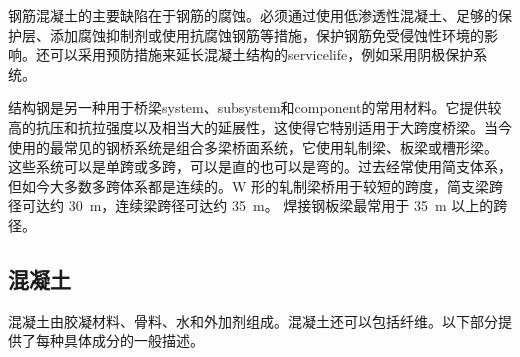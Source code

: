 钢筋混凝土的主要缺陷在于钢筋的腐蚀。必须通过使用低渗透性混凝土、足够的保护层、添加腐蚀抑制剂或使用抗腐蚀钢筋等措施，保护钢筋免受侵蚀性环境的影响。还可以采用预防措施来延长混凝土结构的\gls*{servicelife}，例如采用阴极保护系统。

结构钢是另一种用于桥梁\gls*{system}、\gls*{subsystem}和\gls*{component}的常用材料。它提供较高的抗压和抗拉强度以及相当大的延展性，这使得它特别适用于大跨度桥梁。当今使用的最常见的钢桥系统是组合多梁桥面系统，它使用轧制梁、板梁或槽形梁。 这些系统可以是单跨或多跨，可以是直的也可以是弯的。过去经常使用简支体系，但如今大多数多跨体系都是连续的。W 形的轧制梁桥用于较短的跨度，简支梁跨径可达约 \qty{30}{m}，连续梁跨径可达约 \qty{35}{m}。 焊接钢板梁最常用于 \qty{35}{m} 以上的跨径。

\subsection{混凝土}
混凝土由胶凝材料、骨料、水和外加剂组成。混凝土还可以包括纤维。以下部分提供了每种具体成分的一般描述。

